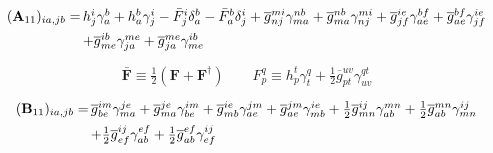 \begin{subappendices}
\begin{equation}
    \label{eq:a11-odc12-formula}
    \begin{array}{r@{\,}l}
        (\mathbf{A}_{11})_{ia,jb}
        =
        &
        h_j^i
        \gamma_a^b
        +
        h_a^b
        \gamma_j^i
        -
        \bar{F}_j^i
        \delta_a^b
        -
        \bar{F}_a^b
        \delta_j^i
        +
        \overline{g}_{nj}^{mi}
        \gamma_{ma}^{nb}
        +
        \overline{g}_{ma}^{nb}
        \gamma_{nj}^{mi}
        +
        \overline{g}_{jf}^{ie}
        \gamma_{ae}^{bf}
        +
        \overline{g}_{ae}^{bf}
        \gamma_{jf}^{ie}
        \\[5pt]
        &
        +
        \overline{g}_{me}^{ib}
        \gamma_{ja}^{me}
        +
        \overline{g}_{ja}^{me}
        \gamma_{me}^{ib}
    \end{array}
\end{equation}

\begin{equation}
    \bar{\mathbf{F}}
    \equiv
    \tfrac{1}{2}
    (\mathbf{F} + \mathbf{F}^\dagger)
    \qquad
    F_p^q
    \equiv
    h_p^t
    \gamma_t^q
    +
    \tfrac{1}{2}
    \overline{g}_{pt}^{uv}
    \gamma_{uv}^{qt}
\end{equation}

\begin{equation}
    \label{eq:b11-odc12-formula}
    \begin{array}{r@{\,}l}
        (\mathbf{B}_{11})_{ia,jb}
        =
        &
        \overline{g}_{be}^{im}
        \gamma_{ma}^{je}
        +
        \overline{g}_{ma}^{je}
        \gamma_{be}^{im}
        +
        \overline{g}_{mb}^{ie}
        \gamma_{ae}^{jm}
        +
        \overline{g}_{ae}^{jm}
        \gamma_{mb}^{ie}
        +
        \tfrac{1}{2}
        \overline{g}_{mn}^{ij}
        \gamma_{ab}^{mn}
        +
        \tfrac{1}{2}
        \overline{g}_{ab}^{mn}
        \gamma_{mn}^{ij}
        \\[5pt]
        &
        +
        \tfrac{1}{2}
        \overline{g}_{ef}^{ij}
        \gamma_{ab}^{ef}
        +
        \tfrac{1}{2}
        \overline{g}_{ab}^{ef}
        \gamma_{ef}^{ij}
    \end{array}
\end{equation}


\end{subappendices}
